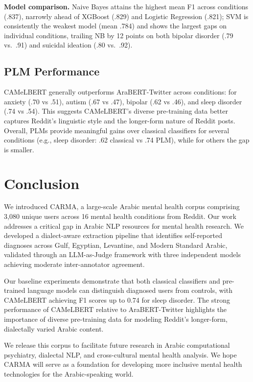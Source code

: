 \documentclass[11pt]{article}
\begin{document}
\textbf{Model comparison.} Naive Bayes attains the highest mean F1 across conditions (.837), narrowly ahead of XGBoost (.829) and Logistic Regression (.821); SVM is consistently the weakest model (mean .784) and shows the largest gaps on individual conditions, trailing NB by 12 points on both bipolar disorder (.79 vs.\ .91) and suicidal ideation (.80 vs.\ .92).

\subsection{PLM Performance}

CAMeLBERT generally outperforms AraBERT-Twitter across conditions: for anxiety (.70 vs .51), autism (.67 vs .47), bipolar (.62 vs .46), and sleep disorder (.74 vs .54). This suggests CAMeLBERT's diverse pre-training data better captures Reddit's linguistic style and the longer-form nature of Reddit posts. Overall, PLMs provide meaningful gains over classical classifiers for several conditions (e.g., sleep disorder: .62 classical vs .74 PLM), while for others the gap is smaller.


\section{Conclusion}
We introduced CARMA, a large-scale Arabic mental health corpus comprising 3,080 unique users across 16 mental health conditions from Reddit. Our work addresses a critical gap in Arabic NLP resources for mental health research. We developed a dialect-aware extraction pipeline that identifies self-reported diagnoses across Gulf, Egyptian, Levantine, and Modern Standard Arabic, validated through an LLM-as-Judge framework with three independent models achieving moderate inter-annotator agreement.

Our baseline experiments demonstrate that both classical classifiers and pre-trained language models can distinguish diagnosed users from controls, with CAMeLBERT achieving F1 scores up to 0.74 for sleep disorder. The strong performance of CAMeLBERT relative to AraBERT-Twitter highlights the importance of diverse pre-training data for modeling Reddit's longer-form, dialectally varied Arabic content.

We release this corpus to facilitate future research in Arabic computational psychiatry, dialectal NLP, and cross-cultural mental health analysis. We hope CARMA will serve as a foundation for developing more inclusive mental health technologies for the Arabic-speaking world.
\end{document}
